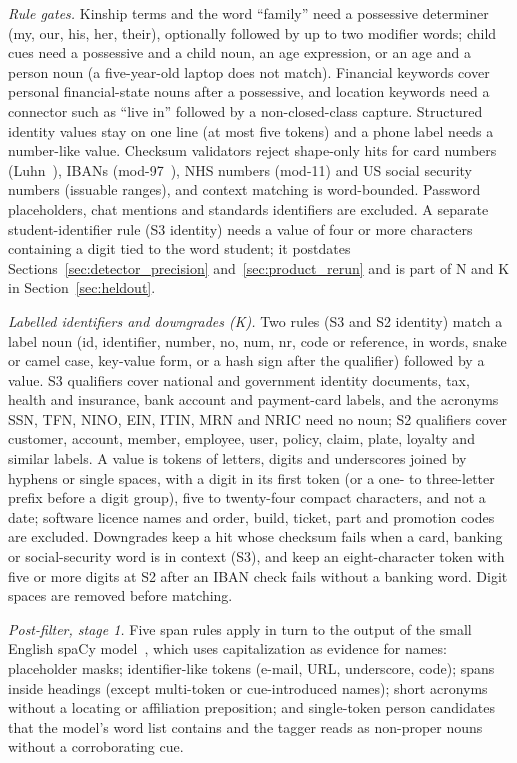 \documentclass[sigconf]{acmart}
\theoremstyle{acmdefinition}\newtheorem{property}{Property}
\begin{document}
\textit{Rule gates.} Kinship terms and the word ``family'' need a possessive determiner (my, our, his, her, their), optionally followed by up to two modifier words; child cues need a possessive and a child noun, an age expression, or an age and a person noun (a five-year-old laptop does not match). Financial keywords cover personal financial-state nouns after a possessive, and location keywords need a connector such as ``live in'' followed by a non-closed-class capture. Structured identity values stay on one line (at most five tokens) and a phone label needs a number-like value. Checksum validators reject shape-only hits for card numbers (Luhn~\cite{Luhn1960Patent}), IBANs (mod-97~\cite{ISO13616Part1_2020}), NHS numbers (mod-11) and US social security numbers (issuable ranges), and context matching is word-bounded. Password placeholders, chat mentions and standards identifiers are excluded. A separate student-identifier rule (S3 identity) needs a value of four or more characters containing a digit tied to the word student; it postdates Sections~\ref{sec:detector_precision} and~\ref{sec:product_rerun} and is part of N and K in Section~\ref{sec:heldout}.

\textit{Labelled identifiers and downgrades (K).} Two rules (S3 and S2 identity) match a label noun (id, identifier, number, no, num, nr, code or reference, in words, snake or camel case, key-value form, or a hash sign after the qualifier) followed by a value. S3 qualifiers cover national and government identity documents, tax, health and insurance, bank account and payment-card labels, and the acronyms SSN, TFN, NINO, EIN, ITIN, MRN and NRIC need no noun; S2 qualifiers cover customer, account, member, employee, user, policy, claim, plate, loyalty and similar labels. A value is tokens of letters, digits and underscores joined by hyphens or single spaces, with a digit in its first token (or a one- to three-letter prefix before a digit group), five to twenty-four compact characters, and not a date; software licence names and order, build, ticket, part and promotion codes are excluded. Downgrades keep a hit whose checksum fails when a card, banking or social-security word is in context (S3), and keep an eight-character token with five or more digits at S2 after an IBAN check fails without a banking word. Digit spaces are removed before matching.

\textit{Post-filter, stage 1.} Five span rules apply in turn to the output of the small English spaCy model~\cite{Honnibal2020SpaCy}, which uses capitalization as evidence for names: placeholder masks; identifier-like tokens (e-mail, URL, underscore, code); spans inside headings (except multi-token or cue-introduced names); short acronyms without a locating or affiliation preposition; and single-token person candidates that the model's word list contains and the tagger reads as non-proper nouns without a corroborating cue.
\end{document}
